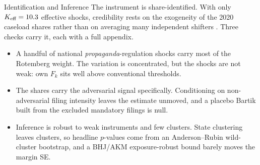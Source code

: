 
\begin{frame}{Identification and Inference}
\hypertarget{src:identbrief}{}
\small
The instrument is share-identified. With only $K_{\text{eff}}=10.3$ effective shocks, credibility rests on the exogeneity of the 2020 caseload shares rather than on averaging many independent shifters \citep{goldsmith2020,borusyak2022}. Three checks carry it, each with a full appendix.
\medskip
\begin{itemize}\itemsep4pt
  \item A handful of national \emph{propaganda}-regulation shocks carry most of the Rotemberg weight. The variation is concentrated, but the shocks are not weak: own $F_k$ sits well above conventional thresholds.
  \item The shares carry the adversarial signal specifically. Conditioning on non-adversarial filing intensity leaves the estimate unmoved, and a placebo Bartik built from the excluded mandatory filings is null.
  \item Inference is robust to weak instruments and few clusters. State clustering leaves \NClusters{} clusters, so headline $p$-values come from an Anderson--Rubin wild-cluster bootstrap, and a BHJ/AKM exposure-robust bound barely moves the margin SE.
\end{itemize}
\smallskip
{}
\end{frame}
